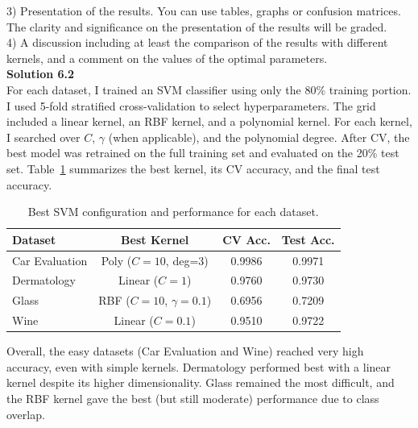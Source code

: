 \documentclass[11pt]{article}
\begin{document}
	3) Presentation of the results. You can use tables, graphs or confusion matrices. The clarity and significance on the presentation of the results will be graded. \\
	
	4) A discussion including at least the comparison of the results with different kernels, and a comment on the values of the optimal parameters.\\
	
	\noindent\textbf{Solution 6.2}\\
	
	For each dataset, I trained an SVM classifier using only the 80\% training portion. I used
	5-fold stratified cross-validation to select hyperparameters. The grid included a linear kernel, an RBF kernel, and a polynomial kernel. For each kernel, I searched over $C$, $\gamma$ (when applicable), and the polynomial degree. After CV, the best model was retrained on the full training set and evaluated on the 20\% test set. Table~\ref{tab:svm_results} summarizes the best kernel, its CV accuracy, and the final test accuracy.
	
	\begin{table}[H]
		\centering
		\renewcommand{\arraystretch}{1.1}
		\begin{tabular}{lccc}
			\toprule
			\textbf{Dataset} & \textbf{Best Kernel} & \textbf{CV Acc.} & \textbf{Test Acc.} \\
			\midrule
			Car Evaluation & Poly ($C{=}10$, deg=3) & 0.9986 & 0.9971 \\
			Dermatology    & Linear ($C{=}1$)       & 0.9760 & 0.9730 \\
			Glass          & RBF ($C{=}10$, $\gamma{=}0.1$) & 0.6956 & 0.7209 \\
			Wine           & Linear ($C{=}0.1$)     & 0.9510 & 0.9722 \\
			\bottomrule
		\end{tabular}
		\caption{Best SVM configuration and performance for each dataset.}
		\label{tab:svm_results}
	\end{table}
	
	Overall, the easy datasets (Car Evaluation and Wine) reached very high accuracy, even with simple
	kernels. Dermatology performed best with a linear kernel despite its higher dimensionality.
	Glass remained the most difficult, and the RBF kernel gave the best (but still moderate)
	performance due to class overlap.
\end{document}
